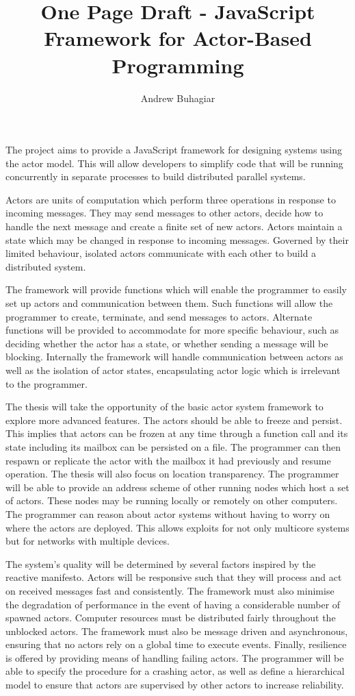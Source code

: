 \documentclass[12pt]{report}
\author{Andrew Buhagiar}
\title{One Page Draft - JavaScript Framework for Actor-Based Programming}
\begin{document}
\maketitle
The project aims to provide a JavaScript framework for designing systems using the actor model. This will allow developers to simplify code that will be running concurrently in separate processes to build distributed parallel systems.

Actors are units of computation which perform three operations in response to incoming messages\cite{agha_1986}. They may send messages to other actors, decide how to handle the next message and create a finite set of new actors. Actors maintain a state which may be changed in response to incoming messages. Governed by their limited behaviour, isolated actors communicate with each other to build a distributed system.

The framework will provide functions which will enable the programmer to easily set up actors and communication between them. Such functions will allow the programmer to create, terminate, and send messages to actors. Alternate functions will be provided to accommodate for more specific behaviour, such as deciding whether the actor has a state, or whether sending a message will be blocking. Internally the framework will handle communication between actors as well as the isolation of actor states, encapsulating actor logic which is irrelevant to the programmer. 

The thesis will take the opportunity of the basic actor system framework to explore more advanced features. The actors should be able to freeze and persist. This implies that actors can be frozen at any time through a function call and its state including its mailbox can be persisted on a file. The programmer can then respawn or replicate the actor with the mailbox it had previously and resume operation. The thesis will also focus on location transparency. The programmer will be able to provide an address scheme of other running nodes which host a set of actors. These nodes may be running locally or remotely on other computers. The programmer can reason about actor systems without having to worry on where the actors are deployed. This allows exploits for not only multicore systems but for networks with multiple devices.

The system’s quality will be determined by several factors inspired by the reactive manifesto\cite{reactivemanifesto}. Actors will be responsive such that they will process and act on received messages fast and consistently. The framework must also minimise the degradation of performance in the event of having a considerable number of spawned actors. Computer resources must be distributed fairly throughout the unblocked actors. The framework must also be message driven and asynchronous, ensuring that no actors rely on a global time to execute events. Finally, resilience is offered by providing means of handling failing actors. The programmer will be able to specify the procedure for a crashing actor, as well as define a hierarchical model to ensure that actors are supervised by other actors to increase reliability.


\end{document}
